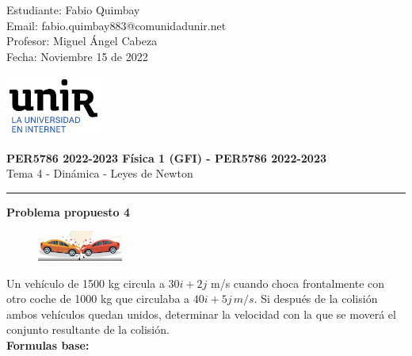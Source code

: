 \documentclass[11pt,letterpaper]{article}
\begin{document}
\pagestyle{plain}

\begin{flushleft}
Estudiante: Fabio Quimbay\\
Email: fabio.quimbay883@comunidadunir.net\\
Profesor: Miguel Ángel Cabeza\\
Fecha: Noviembre 15 de 2022\\
\end{flushleft}

\begin{flushright}\vspace{-20mm}
\includegraphics[height=2cm]{logo.png}
\end{flushright}
 
\begin{center}\vspace{0cm}
\textbf{\large PER5786 2022-2023  Física 1 (GFI) - PER5786 2022-2023}\\
 Tema 4 - Dinámica - Leyes de Newton
\end{center}

 
\rule{\linewidth}{0.1mm}

\bigskip
\bigskip

\textbf{Problema propuesto 4}\\

\begin{figure}
\begin{center}
\includegraphics[width=0.25\textwidth]{problema_4.png}
\end{center}
\end{figure}

Un vehículo de 1500 kg circula a $30i+2j$ m/s cuando choca frontalmente con otro coche de 1000 kg que circulaba a $40i +5j\,m/s$. Si después de la colisión ambos vehículos quedan unidos, determinar la velocidad con la que se moverá el conjunto resultante de la colisión.\\

\textbf{Formulas base:}\\
\end{document}
